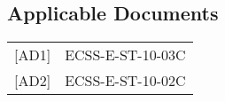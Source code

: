 \subsection{Applicable Documents}
\begin{table}[h!]
    \hspace{-0.5cm}
    \renewcommand{\arraystretch}{1.5}
    \begin{tabular}{ll}
         [AD1] & ECSS-E-ST-10-03C \\
         
         [AD2] & ECSS-E-ST-10-02C \\
    \end{tabular}
    \label{tab:applicable documents}
\end{table}


\nocite{*}
\renewcommand{\bibname}{Reference Documents}
\newrefcontext[labelprefix=RD]
\printbibliography
